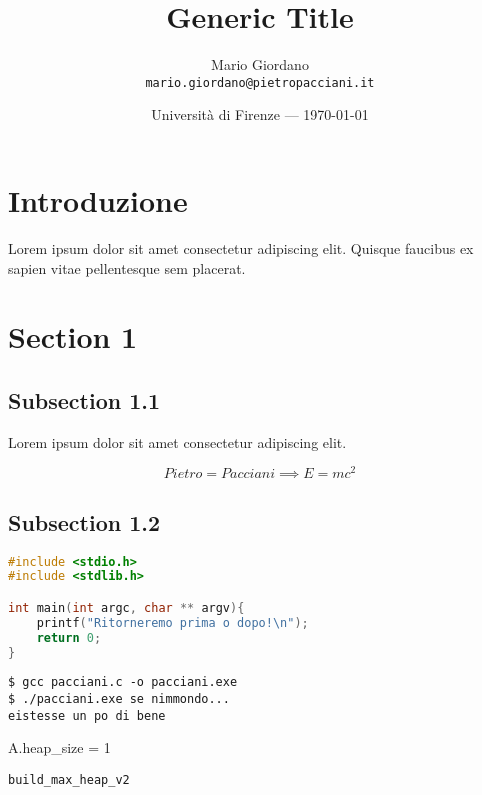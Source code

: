 \documentclass{article}
\title{Generic Title}
\author{Mario Giordano \\ \texttt{mario.giordano@pietropacciani.it}}
\date{Università di Firenze --- \today}
\begin{document}
\maketitle

\section*{Introduzione}
Lorem ipsum dolor sit amet consectetur adipiscing elit. Quisque faucibus ex sapien vitae pellentesque sem placerat. 

\tableofcontents
\newpage


\section{Section 1}
\subsection{Subsection 1.1}
Lorem ipsum dolor sit amet consectetur adipiscing elit.

\begin{equation}
Pietro = Pacciani \implies E = mc^2
\end{equation}

\subsection{Subsection 1.2}
\begin{lstlisting}[language=C]
#include <stdio.h>
#include <stdlib.h>

int main(int argc, char ** argv){
    printf("Ritorneremo prima o dopo!\n");
    return 0;
}
\end{lstlisting}

\begin{commandline}
\begin{verbatim}
$ gcc pacciani.c -o pacciani.exe
$ ./pacciani.exe se nimmondo... 
eistesse un po di bene
\end{verbatim}
\end{commandline}

\begin{center}
\begin{minipage}{0.5\linewidth}
\begin{algorithm}[H]
A.heap\_size = 1 \;
\caption{\texttt{build\_max\_heap\_v2}}
\end{algorithm}
\end{minipage}
\end{center}
\end{document}
